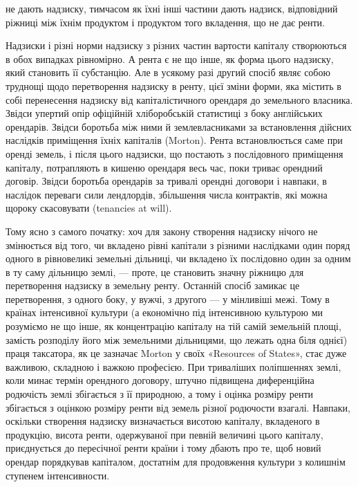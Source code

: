 \parcont{}  %
не дають надзиску, тимчасом як їхні інші частини дають надзиск, відповідний
ріжниці між їхнім продуктом і продуктом того вкладення, що не дає ренти.

Надзиски і різні норми надзиску з різних частин вартости капіталу створюються
в обох випадках рівномірно. А рента є не що інше, як форма цього
надзиску, який становить її субстанцію. Але в усякому разі другий спосіб являє
собою труднощі щодо перетворення надзиску в ренту, цієї зміни форми, яка містить
в собі перенесення надзиску від капіталістичного орендаря до земельного власника.
Звідси упертий опір офіційній хліборобській статистиці з боку англійських
орендарів. Звідси боротьба між ними й землевласниками за встановлення дійсних
наслідків приміщення їхніх капіталів (Morton). Рента встановлюється саме
при оренді земель, і після цього надзиски, що постають з послідовного приміщення
капіталу, потрапляють в кишеню орендаря весь час, поки триває орендний
договір. Звідси боротьба орендарів за тривалі орендні договори і навпаки,
в наслідок переваги сили лендлордів, збільшення числа контрактів, які можна
щороку скасовувати (tenancies at will).

Тому ясно з самого початку: хоч для закону створення надзиску нічого не
змінюється від того, чи вкладено рівні капітали з різними наслідками один поряд
одного в рівновеликі земельні дільниці, чи вкладено їх послідовно один за одним в ту
саму дільницю землі, — проте, це становить значну ріжницю для перетворення
надзиску в земельну ренту. Останній спосіб замикає це перетворення, з одного
боку, у вужчі, з другого — у мінливіші межі. Тому в країнах інтенсивної культури
(а економічно під інтенсивною культурою ми розуміємо не що інше, як
концентрацію капіталу на тій самій земельній площі, замість розподілу його
між земельними дільницями, що лежать одна біля однієї) праця таксатора, як
це зазначає Morton у своїх «Resources of States», стає дуже важливою, складною
і важкою професією. При триваліших поліпшеннях землі, коли минає термін
орендного договору, штучно підвищена диференційна родючість землі збігається
з її природною, а тому і оцінка розміру ренти збігається з оцінкою розміру
ренти від земель різної родючости взагалі. Навпаки, оскільки створення надзиску
визначається висотою капіталу, вкладеного в продукцію, висота ренти, одержуваної
при певній величині цього капіталу, приєднується до пересічної ренти
країни і тому дбають про те, щоб новий орендар порядкував капіталом, достатнім
для продовження культури з колишнім ступенем інтенсивности.

